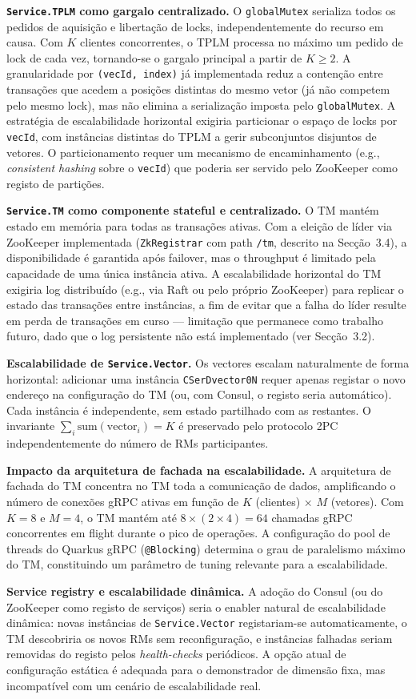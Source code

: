 \textbf{\texttt{Service.TPLM} como gargalo centralizado.}
O \texttt{globalMutex} serializa todos os pedidos de aquisição e libertação de locks,
independentemente do recurso em causa. Com $K$ clientes concorrentes, o TPLM processa no
máximo um pedido de lock de cada vez, tornando-se o gargalo principal a partir de $K \geq 2$.
A granularidade por \texttt{(vecId,~index)} já implementada reduz a contenção entre
transações que acedem a posições distintas do mesmo vetor (já não competem pelo mesmo lock),
mas não elimina a serialização imposta pelo \texttt{globalMutex}. A estratégia de
escalabilidade horizontal exigiria particionar o espaço de locks por \texttt{vecId}, com
instâncias distintas do TPLM a gerir subconjuntos disjuntos de vetores. O particionamento
requer um mecanismo de encaminhamento (e.g., \textit{consistent hashing} sobre o
\texttt{vecId}) que poderia ser servido pelo ZooKeeper como registo de partições.

\textbf{\texttt{Service.TM} como componente stateful e centralizado.}
O TM mantém estado em memória para todas as transações ativas. Com a eleição de líder via ZooKeeper implementada (\texttt{ZkRegistrar} com path
\texttt{/tm}, descrito na Secção~3.4), a disponibilidade é garantida após failover, mas
o throughput é limitado pela capacidade de uma única instância ativa. A escalabilidade
horizontal do TM exigiria log distribuído (e.g., via Raft ou pelo próprio ZooKeeper) para
replicar o estado das transações entre instâncias, a fim de evitar que a falha do líder
resulte em perda de transações em curso --- limitação que permanece como trabalho futuro,
dado que o log persistente não está implementado (ver Secção~3.2).

\textbf{Escalabilidade de \texttt{Service.Vector}.}
Os vectores escalam naturalmente de forma horizontal: adicionar uma instância
\texttt{CSerDvector0N} requer apenas registar o novo endereço na configuração do TM (ou,
com Consul, o registo seria automático). Cada instância é independente, sem estado partilhado
com as restantes. O invariante $\sum_i \text{sum}(\text{vector}_i) = K$ é preservado pelo
protocolo 2PC independentemente do número de RMs participantes.

\textbf{Impacto da arquitetura de fachada na escalabilidade.}
A arquitetura de fachada do TM concentra no TM toda a comunicação de dados, amplificando o
número de conexões gRPC ativas em função de $K$ (clientes) $\times$ $M$ (vetores). Com $K=8$
e $M=4$, o TM mantém até $8 \times (2 \times 4) = 64$ chamadas gRPC concorrentes em flight
durante o pico de operações. A configuração do pool de threads do Quarkus gRPC (\texttt{@Blocking})
determina o grau de paralelismo máximo do TM, constituindo um parâmetro de tuning relevante
para a escalabilidade.

\textbf{Service registry e escalabilidade dinâmica.}
A adoção do Consul (ou do ZooKeeper como registo de serviços) seria o enabler natural de
escalabilidade dinâmica: novas instâncias de \texttt{Service.Vector} registariam-se
automaticamente, o TM descobriria os novos RMs sem reconfiguração, e instâncias falhadas
seriam removidas do registo pelos \textit{health-checks} periódicos. A opção atual de
configuração estática é adequada para o demonstrador de dimensão fixa, mas incompatível com
um cenário de escalabilidade real.
